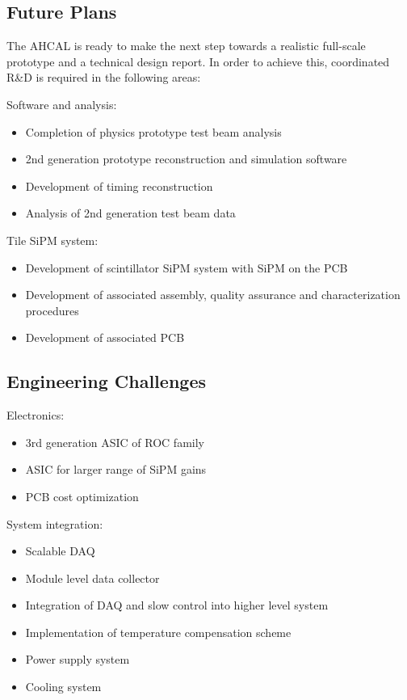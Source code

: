 \subsection{Future Plans}

The AHCAL is ready to make the next step towards a realistic full-scale prototype and a technical design report. In order to achieve this, coordinated R\&D is required in the following areas:

Software and analysis:
\begin{itemize}
\item Completion of physics prototype test beam analysis
\item 2nd generation prototype reconstruction and simulation software
\item Development of timing reconstruction
\item Analysis of 2nd generation test beam data
\end{itemize}

Tile SiPM system:
\begin{itemize}
\item Development of scintillator SiPM system with SiPM on the PCB
\item Development of associated assembly, quality assurance and characterization procedures
\item Development of associated PCB
\end{itemize}

\subsection{Engineering Challenges}

Electronics:
\begin{itemize}
\item 3rd generation ASIC of ROC family
\item ASIC for larger range of SiPM gains
\item PCB cost optimization
\end{itemize}

System integration:
\begin{itemize}
\item Scalable DAQ
\item Module level data collector
\item Integration of DAQ and slow control into higher level system
\item Implementation of temperature compensation scheme
\item Power supply system
\item Cooling system
\end{itemize}

